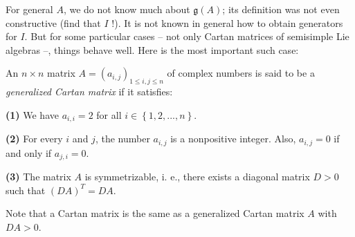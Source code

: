 \documentclass[etingof-lie.tex]{subfiles}
\begin{document}
For general $A$, we do not know much about $\mathfrak{g}\left(  A\right)  $;
its definition was not even constructive (find that $I$ !). It is not known in
general how to obtain generators for $I$. But for some particular cases -- not
only Cartan matrices of semisimple Lie algebras --, things behave well. Here
is the most important such case:

\begin{definition}
An $n\times n$ matrix $A=\left(  a_{i,j}\right)  _{1\leq i,j\leq n}$ of
complex numbers is said to be a \textit{generalized Cartan matrix} if it satisfies:

\textbf{(1)} We have $a_{i,i}=2$ for all $i\in\left\{  1,2,...,n\right\}  $.

\textbf{(2)} For every $i$ and $j$, the number $a_{i,j}$ is a nonpositive
integer. Also, $a_{i,j}=0$ if and only if $a_{j,i}=0$.

\textbf{(3)} The matrix $A$ is symmetrizable, i. e., there exists a diagonal
matrix $D>0$ such that $\left(  DA\right)  ^{T}=DA$.
\end{definition}

Note that a Cartan matrix is the same as a generalized Cartan matrix $A$ with
$DA>0$.
\end{document}
